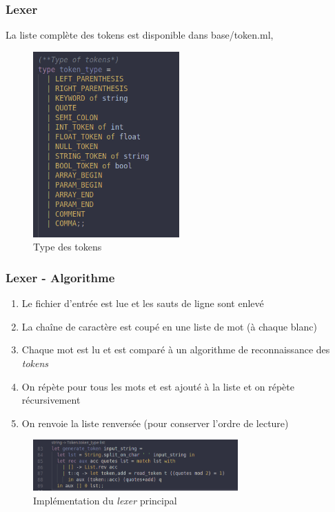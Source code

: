 \documentclass{beamer}
\begin{document}
    \begin{frame}
        \frametitle{Lexer}
        La liste complète des tokens est disponible dans base/token.ml,
        \begin{figure}[H]
            \center
            \includegraphics[width=0.5\textwidth]{img/tokentype.png}
            \caption{Type des tokens}
        \end{figure}
    \end{frame}

    \begin{frame}
        \frametitle{Lexer - Algorithme}
        \begin{enumerate}
            \item<1> Le fichier d'entrée est lue et les sauts de ligne sont enlevé
            \item<2> La chaîne de caractère est coupé en une liste de mot (à chaque blanc)
            \item<3> Chaque mot est lu et est comparé à un algorithme de reconnaissance des \textit{tokens}
            \item<4> On répète pour tous les mots et est ajouté à la liste et on répète récursivement
            \item<5> On renvoie la liste renversée (pour conserver l'ordre de lecture)
        \end{enumerate}
        \begin{figure}[H]
            \center
            \includegraphics[width=0.7\textwidth]{img/implem.png}
            \caption{Implémentation du \textit{lexer} principal}
        \end{figure}
    \end{frame}
\end{document}
